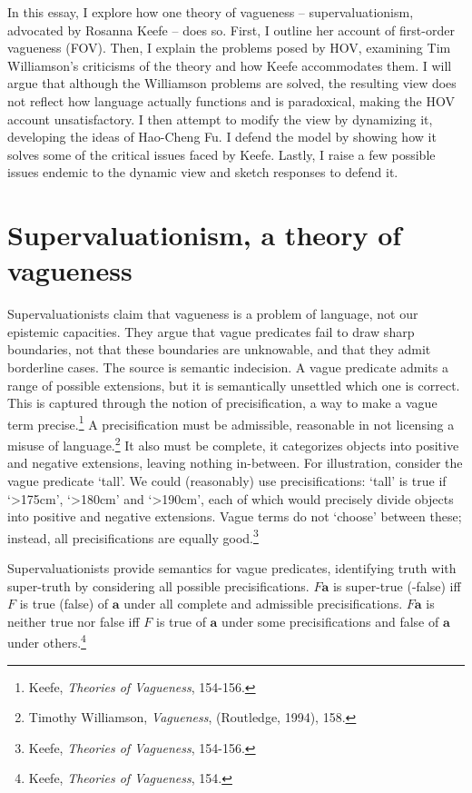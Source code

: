 In this essay, I explore how one theory of vagueness --
supervaluationism, advocated by Rosanna Keefe -- does so. First, I
outline her account of first-order vagueness (FOV). Then, I explain the
problems posed by HOV, examining Tim Williamson's criticisms of the
theory and how Keefe accommodates them. I will argue that although the
Williamson problems are solved, the resulting view does not reflect how
language actually functions and is paradoxical, making the HOV account
unsatisfactory. I then attempt to modify the view by dynamizing it,
developing the ideas of Hao-Cheng Fu. I defend the model by showing how
it solves some of the critical issues faced by Keefe. Lastly, I raise a
few possible issues endemic to the dynamic view and sketch responses to
defend it.

\section{Supervaluationism, a theory of vagueness}

Supervaluationists claim that vagueness is a problem of language, not
our epistemic capacities. They argue that vague predicates fail to draw
sharp boundaries, not that these boundaries are unknowable, and that
they admit borderline cases. The source is semantic indecision. A vague
predicate admits a range of possible extensions, but it is semantically
unsettled which one is correct. This is captured through the notion of
precisification, a way to make a vague term precise.\footnote{Keefe,
  \emph{Theories of Vagueness}, 154-156.} A precisification must be
admissible, reasonable in not licensing a misuse of language.\footnote{Timothy
  Williamson, \emph{Vagueness}, (Routledge, 1994), 158.} It also must be
complete, it categorizes objects into positive and negative extensions,
leaving nothing in-between. For illustration, consider the vague
predicate `tall'. We could (reasonably) use precisifications: `tall' is
true if `\textgreater175cm', `\textgreater180cm' and
`\textgreater190cm', each of which would precisely divide objects into
positive and negative extensions. Vague terms do not `choose' between
these; instead, all precisifications are equally good.\footnote{Keefe,
  \emph{Theories of Vagueness}, 154-156.}

Supervaluationists provide semantics for vague predicates, identifying
truth with super-truth by considering all possible precisifications.
$F\mathbf{a}$ is super-true (-false) iff $F$ is true (false) of
$\mathbf{a}$ under all complete and admissible precisifications.
$F\mathbf{a}$ is neither true nor false iff $F$ is true of
$\mathbf{a}$ under some precisifications and false of $\mathbf{a}$ under
others.\footnote{Keefe, \emph{Theories of Vagueness}, 154.}


